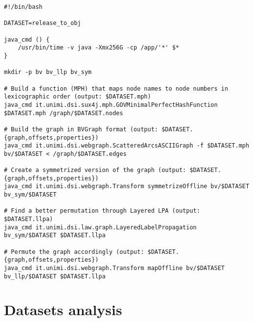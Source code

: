 \documentclass[11pt,a4paper]{article}
\begin{document}
\begin{footnotesize}
\begin{verbatim}
#!/bin/bash

DATASET=release_to_obj

java_cmd () {
    /usr/bin/time -v java -Xmx256G -cp /app/'*' $*
}

mkdir -p bv bv_llp bv_sym

# Build a function (MPH) that maps node names to node numbers in lexicographic order (output: $DATASET.mph)
java_cmd it.unimi.dsi.sux4j.mph.GOVMinimalPerfectHashFunction $DATASET.mph /graph/$DATASET.nodes

# Build the graph in BVGraph format (output: $DATASET.{graph,offsets,properties})
java_cmd it.unimi.dsi.webgraph.ScatteredArcsASCIIGraph -f $DATASET.mph bv/$DATASET < /graph/$DATASET.edges

# Create a symmetrized version of the graph (output: $DATASET.{graph,offsets,properties})
java_cmd it.unimi.dsi.webgraph.Transform symmetrizeOffline bv/$DATASET bv_sym/$DATASET

# Find a better permutation through Layered LPA (output: $DATASET.llpa)
java_cmd it.unimi.dsi.law.graph.LayeredLabelPropagation bv_sym/$DATASET $DATASET.llpa

# Permute the graph accordingly (output: $DATASET.{graph,offsets,properties})
java_cmd it.unimi.dsi.webgraph.Transform mapOffline bv/$DATASET bv_llp/$DATASET $DATASET.llpa
\end{verbatim}
\end{footnotesize}

\section{Datasets analysis}
\end{document}
